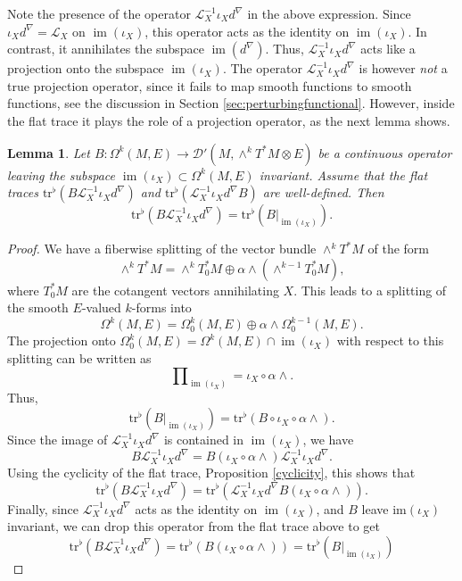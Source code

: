\documentclass[reqno]{amsart}
\newtheorem{lemma}[thm]{Lemma}
\theoremstyle{definition}
\theoremstyle{remark}
\renewcommand{\d}{d^\nabla}
\newcommand{\D}{\mathcal{D}'}
\renewcommand{\L}{\mathcal{L}}
\newcommand{\tr}{\mathrm{tr}^\flat}
\DeclareMathOperator{\im}{im}
\begin{document}
Note the presence of the operator $\L_X^{-1}\iota_X\d$ in the above expression. Since $\iota_X\d = \L_X$ on $\im(\iota_X)$, this operator acts as the identity on $\im(\iota_X)$. In contrast, it annihilates the subspace $\im(\d)$. Thus, $\L_X^{-1}\iota_X\d$ acts like a projection onto the subspace $\im(\iota_X)$. The operator $\L_X^{-1}\iota_X\d$ is however \emph{not} a true projection operator, since it fails to map smooth functions to smooth functions, see the discussion in Section \ref{sec:perturbingfunctional}. However, inside the flat trace it plays the role of a projection operator, as the next lemma shows.

\begin{lemma}
\label{lemma_projection}
Let $B: \Omega^k(M,E) \to \D(M,\wedge^k T^*M \otimes E)$ be a continuous operator leaving the subspace $\im(\iota_X)\subset\Omega^k(M,E)$ invariant. Assume that the flat traces $\tr(B\L_X^{-1}\iota_X\d)$ and $\tr(\L_X^{-1}\iota_X\d B)$ are well-defined. Then
$$\tr(B\L_X^{-1}\iota_X\d) = \tr(B|_{\im(\iota_X)}).$$
\end{lemma}
\begin{proof}
We have a fiberwise splitting of the vector bundle $\wedge^kT^*M$ of the form
$$\wedge^kT^*M = \wedge^kT_0^*M \oplus \alpha\wedge(\wedge^{k-1}T_0^*M),$$
where $T_0^*M$ are the cotangent vectors annihilating $X$. This leads to a splitting of the smooth $E$-valued $k$-forms into
$$\Omega^k(M,E) = \Omega_0^k(M,E)\oplus\alpha\wedge\Omega_0^{k-1}(M,E).$$
The projection onto $\Omega_0^k(M,E) = \Omega^k(M,E)\cap\im(\iota_X)$ with respect to this splitting can be written as
$$\prod\nolimits_{\im(\iota_X)} = \iota_X \circ \alpha\wedge.$$
Thus,
$$\tr(B|_{\im(\iota_X)}) = \tr(B\circ\iota_X\circ\alpha\wedge).$$
Since the image of $\L_X^{-1}\iota_X\d$ is contained in $\im(\iota_X)$, we have
$$B\L_X^{-1}\iota_X\d = B(\iota_X\circ\alpha\wedge)\L_X^{-1}\iota_X\d.$$
Using the cyclicity of the flat trace, Proposition \ref{cyclicity}, this shows that
$$\tr(B\L_X^{-1}\iota_X\d) = \tr(\L_X^{-1}\iota_X\d B (\iota_X\circ\alpha\wedge)).$$
Finally, since $\L_X^{-1}\iota_X\d$ acts as the identity on $\im(\iota_X)$, and $B$ leave $\mathrm{im}(\iota_X)$ invariant, we can drop this operator from the flat trace above to get
$$\tr(B\L_X^{-1}\iota_X\d) = \tr(B (\iota_X\circ\alpha\wedge)) = \tr(B|_{\im(\iota_X)})$$
\end{proof}
\end{document}
